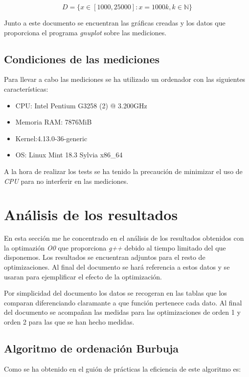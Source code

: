 \documentclass{article}
\begin{document}
$$D = \{x \in [1000, 25000]: x = 1000k, k \in \mathbb{N}\}$$

Junto a este documento se encuentran las gráficas creadas y los datos
que proporciona el programa \textit{gnuplot} sobre las mediciones.

\subsection{Condiciones de las mediciones}

Para llevar a cabo las mediciones se ha utilizado un ordenador con las siguientes características:

\begin{itemize}
\item CPU: Intel Pentium G3258 (2) @ 3.200GHz
\item Memoria RAM: 7876MiB
\item Kernel:4.13.0-36-generic
\item OS: Linux Mint 18.3 Sylvia x86\_64
\end{itemize}

A la hora de realizar los tests se ha tenido la precaución de
minimizar el uso de \textit{CPU} para no interferir en las mediciones.

\section{Análisis de los resultados}

En esta sección me he concentrado en el análisis de los resultados
obtenidos con la optimazión \textit{O0} que proporciona \textit{g++}
debido al tiempo limitado del que disponemos. Los resultados se
encuentran adjuntos para el resto de optimizaciones. Al final del
documento se hará referencia a estos datos y se usaran para
ejemplificar el efecto de la optimización.

Por simplicidad del documento los datos se recogeran en las tablas que
los comparan diferenciando claramante a que función pertenece cada
dato. Al final del documento se acompañan las medidas para las
optimizaciones de orden 1 y orden 2 para las que se han hecho medidas.

\subsection{Algoritmo de ordenación Burbuja}

Como se ha obtenido en el guión de prácticas la eficiencia de este algoritmo es:
\end{document}
